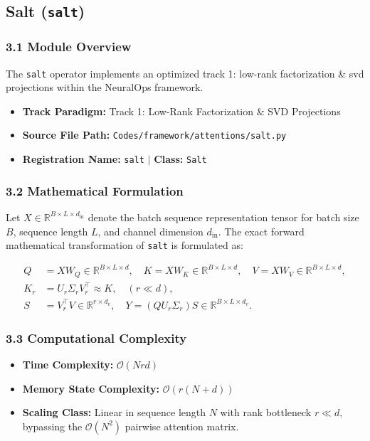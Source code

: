 \subsection{Salt (\texttt{salt})}
\label{sec:app_module_salt}

\subsubsection*{3.1 Module Overview}
The \texttt{salt} operator implements an optimized track 1: low-rank factorization \& svd projections within the NeuralOps framework.
\begin{itemize}
    \item \textbf{Track Paradigm:} Track 1: Low-Rank Factorization \& SVD Projections
    \item \textbf{Source File Path:} \texttt{Codes/framework/attentions/salt.py}
    \item \textbf{Registration Name:} \texttt{salt} $\mid$ \textbf{Class:} \texttt{Salt}
\end{itemize}

\subsubsection*{3.2 Mathematical Formulation}
Let $X \in \mathbb{R}^{B \times L \times d_{\text{in}}}$ denote the batch sequence representation tensor for batch size $B$, sequence length $L$, and channel dimension $d_{\text{in}}$. The exact forward mathematical transformation of \texttt{salt} is formulated as:

\begin{align}
Q &= X W_Q \in \mathbb{R}^{B \times L \times d}, \quad K = X W_K \in \mathbb{R}^{B \times L \times d}, \quad V = X W_V \in \mathbb{R}^{B \times L \times d}, \\
K_r &= U_r \Sigma_r V_r^\top \approx K, \quad (r \ll d), \\
S &= V_r^\top V \in \mathbb{R}^{r \times d_v}, \quad Y = (Q U_r \Sigma_r) S \in \mathbb{R}^{B \times L \times d_v}.
\end{align}


\subsubsection*{3.3 Computational Complexity}
\begin{itemize}
    \item \textbf{Time Complexity:} $\mathcal{O}(N r d)$
    \item \textbf{Memory State Complexity:} $\mathcal{O}(r(N + d))$
    \item \textbf{Scaling Class:} Linear in sequence length $N$ with rank bottleneck $r \ll d$, bypassing the $\mathcal{O}(N^2)$ pairwise attention matrix.
\end{itemize}

